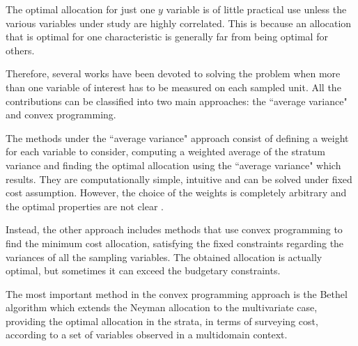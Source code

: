 The optimal allocation for just one $y$ variable is of little practical use unless the various variables under study are highly correlated. 
This is because an allocation that is optimal for one characteristic is generally far from being optimal for others.

Therefore, several works have been devoted to solving the problem when more than one variable of interest has to be measured on each sampled unit.
All the contributions can be classified into two main approaches: the ``average variance" and convex programming.

The methods under the ``average variance" approach consist of defining a weight for each variable to consider, computing a weighted average of the stratum variance and finding the optimal allocation using the ``average variance" which results.
They are computationally simple, intuitive and can be solved under fixed cost assumption.
However, the choice of the weights is completely arbitrary and the optimal properties are not clear \citep[see, e.g.,][for more details]{kish1976optima}.

Instead, the other approach includes methods that use convex programming to find the minimum cost allocation, satisfying the fixed constraints regarding the variances of all the sampling variables.     
The obtained allocation is actually optimal, but sometimes it can exceed the budgetary constraints.

The most important method in the convex programming approach is the Bethel algorithm \citep{bethel1989sample} which extends the Neyman allocation to the multivariate case, providing the optimal allocation in the strata, in terms of surveying cost, according to a set of variables observed in a multidomain context.

